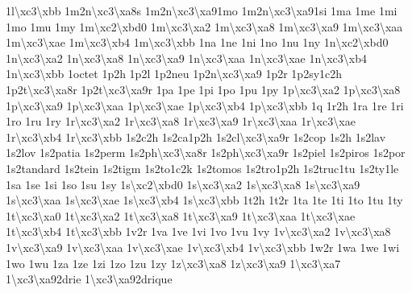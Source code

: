 \begin{DoxyCompactItemize}
1l\textbackslash{}xc3\textbackslash{}xbb 1m2n\textbackslash{}xc3\textbackslash{}xa8s 1m2n\textbackslash{}xc3\textbackslash{}xa91mo 1m2n\textbackslash{}xc3\textbackslash{}xa91si 1ma 1me 1mi 1mo 1mu 1my 1m\textbackslash{}xc2\textbackslash{}xbd0 1m\textbackslash{}xc3\textbackslash{}xa2 1m\textbackslash{}xc3\textbackslash{}xa8 1m\textbackslash{}xc3\textbackslash{}xa9 1m\textbackslash{}xc3\textbackslash{}xaa 1m\textbackslash{}xc3\textbackslash{}xae 1m\textbackslash{}xc3\textbackslash{}xb4 1m\textbackslash{}xc3\textbackslash{}xbb 1na 1ne 1ni 1no 1nu 1ny 1n\textbackslash{}xc2\textbackslash{}xbd0 1n\textbackslash{}xc3\textbackslash{}xa2 1n\textbackslash{}xc3\textbackslash{}xa8 1n\textbackslash{}xc3\textbackslash{}xa9 1n\textbackslash{}xc3\textbackslash{}xaa 1n\textbackslash{}xc3\textbackslash{}xae 1n\textbackslash{}xc3\textbackslash{}xb4 1n\textbackslash{}xc3\textbackslash{}xbb 1octet 1p2h 1p2l 1p2neu 1p2n\textbackslash{}xc3\textbackslash{}xa9 1p2r 1p2sy1c2h 1p2t\textbackslash{}xc3\textbackslash{}xa8r 1p2t\textbackslash{}xc3\textbackslash{}xa9r 1pa 1pe 1pi 1po 1pu 1py 1p\textbackslash{}xc3\textbackslash{}xa2 1p\textbackslash{}xc3\textbackslash{}xa8 1p\textbackslash{}xc3\textbackslash{}xa9 1p\textbackslash{}xc3\textbackslash{}xaa 1p\textbackslash{}xc3\textbackslash{}xae 1p\textbackslash{}xc3\textbackslash{}xb4 1p\textbackslash{}xc3\textbackslash{}xbb 1q 1r2h 1ra 1re 1ri 1ro 1ru 1ry 1r\textbackslash{}xc3\textbackslash{}xa2 1r\textbackslash{}xc3\textbackslash{}xa8 1r\textbackslash{}xc3\textbackslash{}xa9 1r\textbackslash{}xc3\textbackslash{}xaa 1r\textbackslash{}xc3\textbackslash{}xae 1r\textbackslash{}xc3\textbackslash{}xb4 1r\textbackslash{}xc3\textbackslash{}xbb 1s2c2h 1s2ca1p2h 1s2cl\textbackslash{}xc3\textbackslash{}xa9r 1s2cop 1s2h 1s2lav 1s2lov 1s2patia 1s2perm 1s2ph\textbackslash{}xc3\textbackslash{}xa8r 1s2ph\textbackslash{}xc3\textbackslash{}xa9r 1s2piel 1s2piros 1s2por 1s2tandard 1s2tein 1s2tigm 1s2to1c2k 1s2tomos 1s2tro1p2h 1s2truc1tu 1s2ty1le 1sa 1se 1si 1so 1su 1sy 1s\textbackslash{}xc2\textbackslash{}xbd0 1s\textbackslash{}xc3\textbackslash{}xa2 1s\textbackslash{}xc3\textbackslash{}xa8 1s\textbackslash{}xc3\textbackslash{}xa9 1s\textbackslash{}xc3\textbackslash{}xaa 1s\textbackslash{}xc3\textbackslash{}xae 1s\textbackslash{}xc3\textbackslash{}xb4 1s\textbackslash{}xc3\textbackslash{}xbb 1t2h 1t2r 1ta 1te 1ti 1to 1tu 1ty 1t\textbackslash{}xc3\textbackslash{}xa0 1t\textbackslash{}xc3\textbackslash{}xa2 1t\textbackslash{}xc3\textbackslash{}xa8 1t\textbackslash{}xc3\textbackslash{}xa9 1t\textbackslash{}xc3\textbackslash{}xaa 1t\textbackslash{}xc3\textbackslash{}xae 1t\textbackslash{}xc3\textbackslash{}xb4 1t\textbackslash{}xc3\textbackslash{}xbb 1v2r 1va 1ve 1vi 1vo 1vu 1vy 1v\textbackslash{}xc3\textbackslash{}xa2 1v\textbackslash{}xc3\textbackslash{}xa8 1v\textbackslash{}xc3\textbackslash{}xa9 1v\textbackslash{}xc3\textbackslash{}xaa 1v\textbackslash{}xc3\textbackslash{}xae 1v\textbackslash{}xc3\textbackslash{}xb4 1v\textbackslash{}xc3\textbackslash{}xbb 1w2r 1wa 1we 1wi 1wo 1wu 1za 1ze 1zi 1zo 1zu 1zy 1z\textbackslash{}xc3\textbackslash{}xa8 1z\textbackslash{}xc3\textbackslash{}xa9 1\textbackslash{}xc3\textbackslash{}xa7 1\textbackslash{}xc3\textbackslash{}xa92drie 1\textbackslash{}xc3\textbackslash{}xa92drique 
\end{DoxyCompactItemize}
